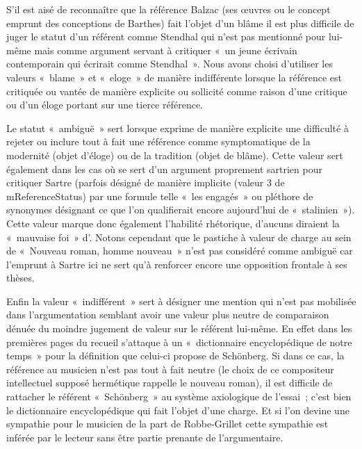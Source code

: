 \documentclass[12pt, a4paper]{article}
\begin{document}
S'il est aisé de reconnaître que la référence Balzac (ses œuvres ou le concept emprunt des conceptions de Barthes) fait l'objet d'un blâme il est plus difficile de juger le statut d'un référent comme Stendhal qui n'est pas mentionné pour lui-même mais comme argument servant à critiquer «~un jeune écrivain contemporain qui écrirait comme Stendhal~». Nous avons choisi d'utiliser les valeurs «~blame~» et «~eloge~» de manière indifférente lorsque la référence est critiquée ou vantée de manière explicite ou sollicité comme raison d'une critique ou d'un éloge portant sur une tierce référence.

Le statut «~ambiguë~» sert lorsque \robbe{} exprime de manière explicite une difficulté à rejeter ou inclure tout à fait une référence comme symptomatique de la modernité (objet d'éloge) ou de la tradition (objet de blâme). Cette valeur sert également dans les cas où \robbe{} se sert d'un argument proprement sartrien pour critiquer Sartre (parfois désigné de manière implicite (valeur 3 de mReferenceStatus) par une formule telle «~les engagés~» ou pléthore de synonymes désignant ce que l'on qualifierait encore aujourd'hui de «~stalinien~»). Cette valeur marque donc également l'habilité rhétorique, d'aucuns diraient la «~mauvaise foi~» d'\robbe{}. Notons cependant que le pastiche à valeur de charge au sein de «~Nouveau roman, homme nouveau~» n'est pas considéré comme ambiguë car l'emprunt à Sartre ici ne sert qu'à renforcer encore une opposition frontale à ses thèses.

Enfin la valeur «~indifférent~» sert à désigner une mention qui n'est pas mobilisée dans l'argumentation semblant avoir une valeur plus neutre de comparaison dénuée du moindre jugement de valeur sur le référent lui-même. En effet dans les premières pages du recueil \robbe{} s'attaque à un «~dictionnaire encyclopédique de notre temps~» pour la définition que celui-ci propose de Schönberg. Si dans ce cas, la référence au musicien n'est pas tout à fait neutre (le choix de ce compositeur intellectuel supposé hermétique rappelle le nouveau roman), il est difficile de rattacher le référent «~Schönberg~» au système axiologique de l'essai~; c'est bien le dictionnaire encyclopédique qui fait l'objet d'une charge. Et si l'on devine une sympathie pour le musicien de la part de Robbe-Grillet cette sympathie est inférée par le lecteur sans être partie prenante de l'argumentaire.
   

\end{document}
